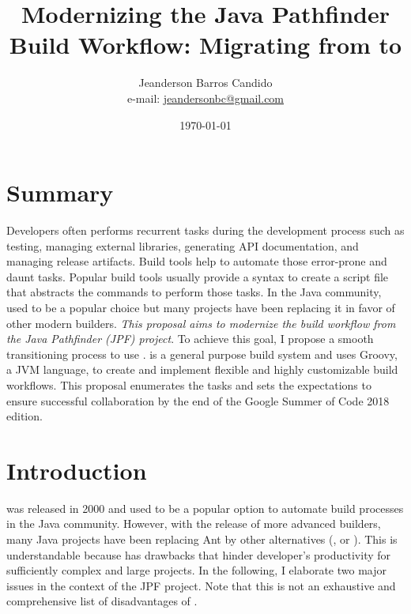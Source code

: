 \documentclass[a4paper, 12pt]{article}
\author{Jeanderson Barros Candido\\e-mail: \url{jeandersonbc@gmail.com}}
\title{Modernizing the Java Pathfinder Build Workflow: Migrating from \ant{} to
\gradle{}}
\date{\today}
\begin{document}
\maketitle

\section*{Summary}

Developers often performs recurrent tasks during the development process such
as testing, managing external libraries, generating API documentation, and
managing release artifacts.
Build tools help to automate those error-prone and daunt tasks.
Popular build tools usually provide a syntax to create a script file that
abstracts the commands to perform those tasks.
In the Java community, \ant{} used to be a popular choice but many
projects have been replacing it in favor of other modern builders.
\emph{This proposal aims to modernize the build workflow from the Java
Pathfinder (JPF) project}.
To achieve this goal, I propose a smooth transitioning process to use
\gradle{}.
\gradle{} is a general purpose build system and uses Groovy, a JVM language, to
create and implement flexible and highly customizable build workflows.
This proposal enumerates the tasks and sets the expectations to ensure
successful collaboration by the end of the Google Summer of Code 2018 edition.

\section{Introduction}
\label{sec:intro}

\ant{}\cite{page:ant} was released in 2000 and used to be a popular option to
automate build processes in the Java community.
However, with the release of more advanced builders, many Java projects have
been replacing Ant by other alternatives (\eg, \gradle{}\cite{page:gradle} or
\maven{}\cite{page:maven}).
This is understandable because \ant{} has drawbacks that hinder developer's
productivity for sufficiently complex and large projects.
In the following, I elaborate two major issues in the context of the JPF
project.
Note that this is not an exhaustive and comprehensive list of disadvantages of
\ant{}.
\end{document}
